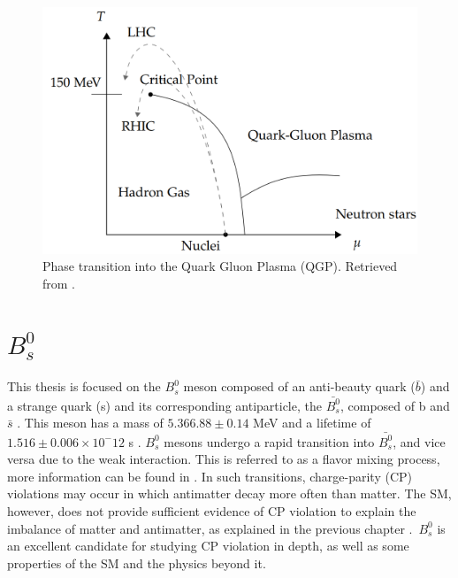 \begin{figure}[htp!]
	\centering
	\includegraphics[scale=0.34]{MainContent/Figs/QGP.png}
	\caption{Phase transition into the Quark Gluon Plasma (QGP). Retrieved from \cite{parkkila2021quantifying}.}
	\label{fig:qgp}
\end{figure}
\section{$B^0_s$}
This thesis is focused on the $B^0_s$ meson composed of an anti-beauty quark ($\bar{b}$) and a strange quark (s) and its corresponding antiparticle, the $\bar{B^0_s}$, composed of b and $\bar{s}$ \cite{mejia2012medida}. This meson has a mass of $5.366.88 \pm 0.14$ MeV and a lifetime of $1.516\pm 0.006 \times 10^-{12}$ s \cite{pdgstrange}. $B^0_s$ mesons undergo a rapid transition into $\bar{B^0_s}$, and vice versa due to the weak interaction. This is referred to as a flavor mixing process, more information can be found in \cite{mejia2012medida, greevenanalysis}. In such transitions, charge-parity (CP) violations may occur in which antimatter decay more often than matter. The SM, however, does not provide sufficient evidence of CP violation to explain the imbalance of matter and antimatter, as explained in the previous chapter \cite{greevenanalysis, cern2020lhcb}. $B^0_s$ is an excellent candidate for studying CP violation in depth, as well as some properties of the SM and the physics beyond it.

